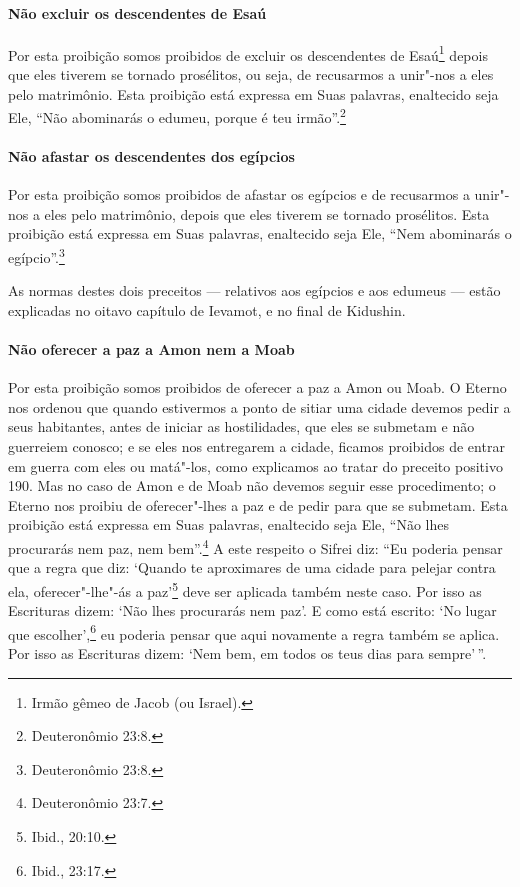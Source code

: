 \begin{multicols}{2}
\paragraph{Não excluir os descendentes de Esaú}

Por esta proibição somos proibidos de excluir os descendentes de
Esaú\footnote{Irmão gêmeo de Jacob\starr{} (ou Israel).} depois que eles tiverem se tornado
prosélitos, ou seja, de recusarmos a unir"-nos a eles pelo matrimônio.
Esta proibição está expressa em Suas palavras, enaltecido seja Ele,
``Não abominarás o edumeu,\starr{} porque é teu irmão''.\footnote{Deuteronômio 23:8.}

\paragraph{Não afastar os descendentes dos egípcios}

Por esta proibição somos proibidos de afastar os egípcios e de
recusarmos a unir"-nos a eles pelo matrimônio, depois que eles tiverem se
tornado prosélitos. Esta proibição está expressa em Suas palavras,
enaltecido seja Ele, ``Nem abominarás o egípcio''.\footnote{Deuteronômio 23:8.}

As normas destes dois preceitos --- relativos aos egípcios e aos edumeus\starr{}
--- estão explicadas no oitavo capítulo de Ievamot\starr, e no final de
Kidushin\starr.

\paragraph{Não oferecer a paz a Amon\starr{} nem a Moab\starr}

Por esta proibição somos proibidos de oferecer a paz a Amon\starr{} ou Moab\starr. O
Eterno nos ordenou que quando estivermos a ponto de sitiar uma cidade
devemos pedir a seus habitantes, antes de iniciar as hostilidades, que
eles se submetam e não guerreiem conosco; e se eles nos entregarem a
cidade, ficamos proibidos de entrar em guerra com eles ou matá"-los,
como explicamos ao tratar do preceito positivo 190. Mas no caso de Amon\starr{}
e de Moab\starr{} não devemos seguir esse procedimento; o Eterno nos proibiu de
oferecer"-lhes a paz e de pedir para que se submetam. Esta proibição
está expressa em Suas palavras, enaltecido seja Ele, ``Não lhes
procurarás nem paz, nem bem''.\footnote{Deuteronômio 23:7.} A este respeito o
Sifrei\starr{} diz: ``Eu poderia pensar que a regra que diz: `Quando te
aproximares de uma cidade para pelejar contra ela, oferecer"-lhe"-ás a
paz'\footnote{Ibid., 20:10.} deve ser aplicada também neste caso. Por isso as
Escrituras dizem: `Não lhes procurarás nem paz'. E como está escrito:
`No lugar que escolher',\footnote{Ibid., 23:17.} eu poderia pensar que aqui
novamente a regra também se aplica. Por isso as Escrituras dizem: `Nem
bem, em todos os teus dias para sempre'\,''.


\end{multicols}
